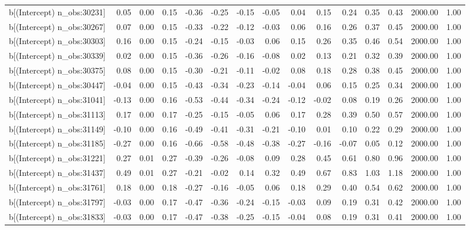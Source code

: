 \begin{table}[ht]
\begin{tabular}{rrrrrrrrrrrrrrr}
  b[(Intercept) n\_obs:30231] & 0.05 & 0.00 & 0.15 & -0.36 & -0.25 & -0.15 & -0.05 & 0.04 & 0.15 & 0.24 & 0.35 & 0.43 & 2000.00 & 1.00 \\ 
  b[(Intercept) n\_obs:30267] & 0.07 & 0.00 & 0.15 & -0.33 & -0.22 & -0.12 & -0.03 & 0.06 & 0.16 & 0.26 & 0.37 & 0.45 & 2000.00 & 1.00 \\ 
  b[(Intercept) n\_obs:30303] & 0.16 & 0.00 & 0.15 & -0.24 & -0.15 & -0.03 & 0.06 & 0.15 & 0.26 & 0.35 & 0.46 & 0.54 & 2000.00 & 1.00 \\ 
  b[(Intercept) n\_obs:30339] & 0.02 & 0.00 & 0.15 & -0.36 & -0.26 & -0.16 & -0.08 & 0.02 & 0.13 & 0.21 & 0.32 & 0.39 & 2000.00 & 1.00 \\ 
  b[(Intercept) n\_obs:30375] & 0.08 & 0.00 & 0.15 & -0.30 & -0.21 & -0.11 & -0.02 & 0.08 & 0.18 & 0.28 & 0.38 & 0.45 & 2000.00 & 1.00 \\ 
  b[(Intercept) n\_obs:30447] & -0.04 & 0.00 & 0.15 & -0.43 & -0.34 & -0.23 & -0.14 & -0.04 & 0.06 & 0.15 & 0.25 & 0.34 & 2000.00 & 1.00 \\ 
  b[(Intercept) n\_obs:31041] & -0.13 & 0.00 & 0.16 & -0.53 & -0.44 & -0.34 & -0.24 & -0.12 & -0.02 & 0.08 & 0.19 & 0.26 & 2000.00 & 1.00 \\ 
  b[(Intercept) n\_obs:31113] & 0.17 & 0.00 & 0.17 & -0.25 & -0.15 & -0.05 & 0.06 & 0.17 & 0.28 & 0.39 & 0.50 & 0.57 & 2000.00 & 1.00 \\ 
  b[(Intercept) n\_obs:31149] & -0.10 & 0.00 & 0.16 & -0.49 & -0.41 & -0.31 & -0.21 & -0.10 & 0.01 & 0.10 & 0.22 & 0.29 & 2000.00 & 1.00 \\ 
  b[(Intercept) n\_obs:31185] & -0.27 & 0.00 & 0.16 & -0.66 & -0.58 & -0.48 & -0.38 & -0.27 & -0.16 & -0.07 & 0.05 & 0.12 & 2000.00 & 1.00 \\ 
  b[(Intercept) n\_obs:31221] & 0.27 & 0.01 & 0.27 & -0.39 & -0.26 & -0.08 & 0.09 & 0.28 & 0.45 & 0.61 & 0.80 & 0.96 & 2000.00 & 1.00 \\ 
  b[(Intercept) n\_obs:31437] & 0.49 & 0.01 & 0.27 & -0.21 & -0.02 & 0.14 & 0.32 & 0.49 & 0.67 & 0.83 & 1.03 & 1.18 & 2000.00 & 1.00 \\ 
  b[(Intercept) n\_obs:31761] & 0.18 & 0.00 & 0.18 & -0.27 & -0.16 & -0.05 & 0.06 & 0.18 & 0.29 & 0.40 & 0.54 & 0.62 & 2000.00 & 1.00 \\ 
  b[(Intercept) n\_obs:31797] & -0.03 & 0.00 & 0.17 & -0.47 & -0.36 & -0.24 & -0.15 & -0.03 & 0.09 & 0.19 & 0.31 & 0.42 & 2000.00 & 1.00 \\ 
  b[(Intercept) n\_obs:31833] & -0.03 & 0.00 & 0.17 & -0.47 & -0.38 & -0.25 & -0.15 & -0.04 & 0.08 & 0.19 & 0.31 & 0.41 & 2000.00 & 1.00 \\ 

\end{tabular}
\end{table}
